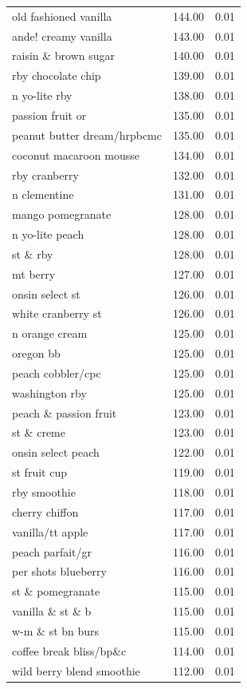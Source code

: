\begin{table}
\begin{tabular}{lrr}
old fashioned vanilla & 144.00 & 0.01 \\
ande! creamy vanilla & 143.00 & 0.01 \\
raisin \& brown sugar & 140.00 & 0.01 \\
rby chocolate chip & 139.00 & 0.01 \\
n yo-lite rby & 138.00 & 0.01 \\
passion fruit or & 135.00 & 0.01 \\
peanut butter dream/hrpbcmc & 135.00 & 0.01 \\
coconut macaroon mousse & 134.00 & 0.01 \\
rby cranberry & 132.00 & 0.01 \\
n clementine & 131.00 & 0.01 \\
mango pomegranate & 128.00 & 0.01 \\
n yo-lite peach & 128.00 & 0.01 \\
st \& rby & 128.00 & 0.01 \\
mt berry & 127.00 & 0.01 \\
onsin select st & 126.00 & 0.01 \\
white cranberry st & 126.00 & 0.01 \\
n orange cream & 125.00 & 0.01 \\
oregon bb & 125.00 & 0.01 \\
peach cobbler/cpc & 125.00 & 0.01 \\
washington rby & 125.00 & 0.01 \\
peach \& passion fruit & 123.00 & 0.01 \\
st \& creme & 123.00 & 0.01 \\
onsin select peach & 122.00 & 0.01 \\
st fruit cup & 119.00 & 0.01 \\
rby smoothie & 118.00 & 0.01 \\
cherry chiffon & 117.00 & 0.01 \\
vanilla/tt apple & 117.00 & 0.01 \\
peach parfait/gr & 116.00 & 0.01 \\
per shots blueberry & 116.00 & 0.01 \\
st \& pomegranate & 115.00 & 0.01 \\
vanilla \& st \& b & 115.00 & 0.01 \\
w-m \& st bn burs & 115.00 & 0.01 \\
coffee break bliss/bp\&c & 114.00 & 0.01 \\
wild berry blend smoothie & 112.00 & 0.01 \\

\end{tabular}
\end{table}
